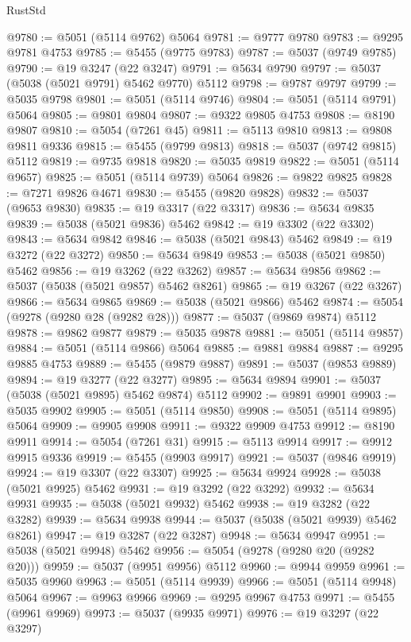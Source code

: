 \begin{lexlean}{RustStd}
\begin{coremodule}
@9780 := @5051 (@5114 @9762) @5064
@9781 := @9777 @9780
@9783 := @9295 @9781 @4753
@9785 := @5455 (@9775 @9783)
@9787 := @5037 (@9749 @9785)
@9790 := @19 @3247 (@22 @3247)
@9791 := @5634 @9790
@9797 := @5037 (@5038 (@5021 @9791) @5462 @9770) @5112
@9798 := @9787 @9797
@9799 := @5035 @9798
@9801 := @5051 (@5114 @9746)
@9804 := @5051 (@5114 @9791) @5064
@9805 := @9801 @9804
@9807 := @9322 @9805 @4753
@9808 := @8190 @9807
@9810 := @5054 (@7261 @45)
@9811 := @5113 @9810
@9813 := @9808 @9811 @9336
@9815 := @5455 (@9799 @9813)
@9818 := @5037 (@9742 @9815) @5112
@9819 := @9735 @9818
@9820 := @5035 @9819
@9822 := @5051 (@5114 @9657)
@9825 := @5051 (@5114 @9739) @5064
@9826 := @9822 @9825
@9828 := @7271 @9826 @4671
@9830 := @5455 (@9820 @9828)
@9832 := @5037 (@9653 @9830)
@9835 := @19 @3317 (@22 @3317)
@9836 := @5634 @9835
@9839 := @5038 (@5021 @9836) @5462
@9842 := @19 @3302 (@22 @3302)
@9843 := @5634 @9842
@9846 := @5038 (@5021 @9843) @5462
@9849 := @19 @3272 (@22 @3272)
@9850 := @5634 @9849
@9853 := @5038 (@5021 @9850) @5462
@9856 := @19 @3262 (@22 @3262)
@9857 := @5634 @9856
@9862 := @5037 (@5038 (@5021 @9857) @5462 @8261)
@9865 := @19 @3267 (@22 @3267)
@9866 := @5634 @9865
@9869 := @5038 (@5021 @9866) @5462
@9874 := @5054 (@9278 (@9280 @28 (@9282 @28)))
@9877 := @5037 (@9869 @9874) @5112
@9878 := @9862 @9877
@9879 := @5035 @9878
@9881 := @5051 (@5114 @9857)
@9884 := @5051 (@5114 @9866) @5064
@9885 := @9881 @9884
@9887 := @9295 @9885 @4753
@9889 := @5455 (@9879 @9887)
@9891 := @5037 (@9853 @9889)
@9894 := @19 @3277 (@22 @3277)
@9895 := @5634 @9894
@9901 := @5037 (@5038 (@5021 @9895) @5462 @9874) @5112
@9902 := @9891 @9901
@9903 := @5035 @9902
@9905 := @5051 (@5114 @9850)
@9908 := @5051 (@5114 @9895) @5064
@9909 := @9905 @9908
@9911 := @9322 @9909 @4753
@9912 := @8190 @9911
@9914 := @5054 (@7261 @31)
@9915 := @5113 @9914
@9917 := @9912 @9915 @9336
@9919 := @5455 (@9903 @9917)
@9921 := @5037 (@9846 @9919)
@9924 := @19 @3307 (@22 @3307)
@9925 := @5634 @9924
@9928 := @5038 (@5021 @9925) @5462
@9931 := @19 @3292 (@22 @3292)
@9932 := @5634 @9931
@9935 := @5038 (@5021 @9932) @5462
@9938 := @19 @3282 (@22 @3282)
@9939 := @5634 @9938
@9944 := @5037 (@5038 (@5021 @9939) @5462 @8261)
@9947 := @19 @3287 (@22 @3287)
@9948 := @5634 @9947
@9951 := @5038 (@5021 @9948) @5462
@9956 := @5054 (@9278 (@9280 @20 (@9282 @20)))
@9959 := @5037 (@9951 @9956) @5112
@9960 := @9944 @9959
@9961 := @5035 @9960
@9963 := @5051 (@5114 @9939)
@9966 := @5051 (@5114 @9948) @5064
@9967 := @9963 @9966
@9969 := @9295 @9967 @4753
@9971 := @5455 (@9961 @9969)
@9973 := @5037 (@9935 @9971)
@9976 := @19 @3297 (@22 @3297)

\end{coremodule}
\end{lexlean}
